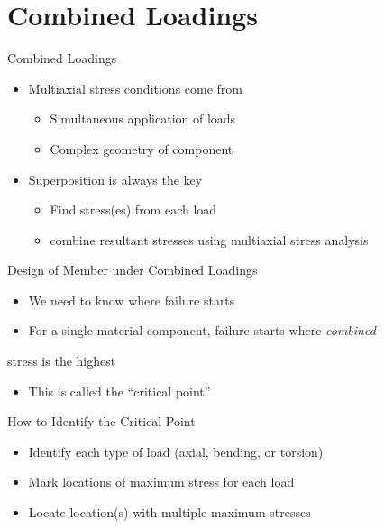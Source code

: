 \documentclass[10pt, svgnames]{beamer}
\begin{document}
\section{Combined Loadings}
\label{sec:org05a7ee8}

\begin{frame}[label={sec:org8780563}]{Combined Loadings}
\begin{itemize}
\item Multiaxial stress conditions come from
\begin{itemize}
\item Simultaneous application of loads
\item Complex geometry of component
\end{itemize}
\item Superposition is always the key
\begin{itemize}
\item Find stress(es) from each load
\item combine resultant stresses using multiaxial stress analysis
\end{itemize}
\end{itemize}
\end{frame}

\begin{frame}[label={sec:orgf16f9b2}]{Design of Member under Combined Loadings}
\begin{itemize}
\item We need to know where failure starts
\item For a single-material component, failure starts where \emph{combined}
\end{itemize}
stress is the highest
\begin{itemize}
\item This is called the ``critical point''
\end{itemize}
\end{frame}

\begin{frame}[label={sec:orgab2b843}]{How to Identify the Critical Point}
\begin{itemize}
\item Identify each type of load (axial, bending, or torsion)
\item Mark locations of maximum stress for each load
\item Locate location(s) with multiple maximum stresses
\end{itemize}
\end{frame}
\end{document}
